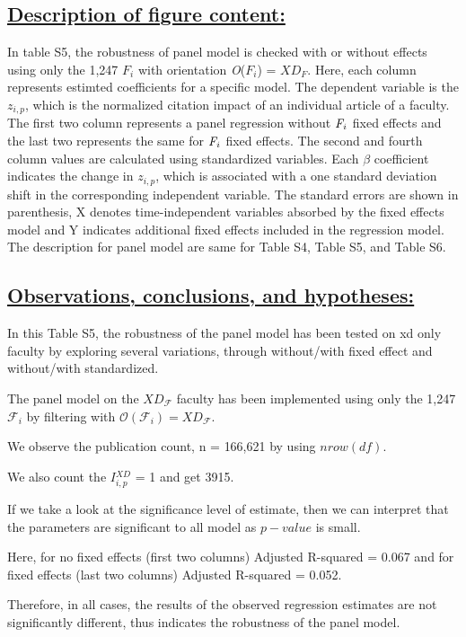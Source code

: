 \documentclass{article}\usepackage[]{graphicx}\usepackage[]{color}
\begin{document}
\subsection*{\underline{Description of figure content:}}
\par{In table S5, the robustness of panel model is checked with or without effects using only the 1,247 ${\textit{F}{_i}}$ with orientation {\textit O}(${\textit{F}{_i}}$) = $XD_{\textit{F}}$. Here, each column represents estimted coefficients for a specific model. The dependent variable is the $z{_{i,p}}$, which is the normalized citation impact of an individual article of a faculty. The first two column represents a panel regression without ${{\it{F}}_i}$ fixed effects and the last two represents the same for ${{\it{F}}_i}$ fixed effects. The second and fourth column values are calculated using standardized variables. Each $\beta$ coefficient indicates the change in $z{_{i,p}}$, which is associated with a one standard deviation shift in the corresponding independent variable. The standard errors are shown in parenthesis, X denotes time-independent variables absorbed by the fixed effects model and Y indicates additional fixed effects included in the regression model. The description for panel model are same for Table S4, Table S5, and Table S6.
}

\subsection*{\underline{Observations, conclusions, and hypotheses:}}
\begin{description}
  \item
  \item In this Table S5, the robustness of the panel model has been tested on xd only faculty by exploring several variations, through without/with fixed effect and without/with standardized.
  \item[$\bullet$] The panel model on the $XD_\mathcal{F}$ faculty has been implemented using only the 1,247 $\mathcal{F}_i$ by filtering with $\mathscr{O}(\mathcal{F}_i) = XD_\mathcal{F}$.
  \item[$\bullet$] We observe the publication count, n = 166,621 by using $nrow(df)$.
  \item[$\bullet$] We also count the $I{^{XD}_{i,p}}$ = 1 and get 3915.
  \item[$\bullet$] If we take a look at the significance level of estimate, then we can interpret that the parameters are significant to all model as $p-value$ is small. 
    \item[$\bullet$] Here, for no fixed effects (first two columns) Adjusted R-squared = 0.067 and for fixed effects (last two columns) Adjusted R-squared = 0.052.
  \item Therefore, in all cases, the results of the observed regression estimates are not significantly different, thus indicates the robustness of the panel model.
\end{description}
\end{document}
